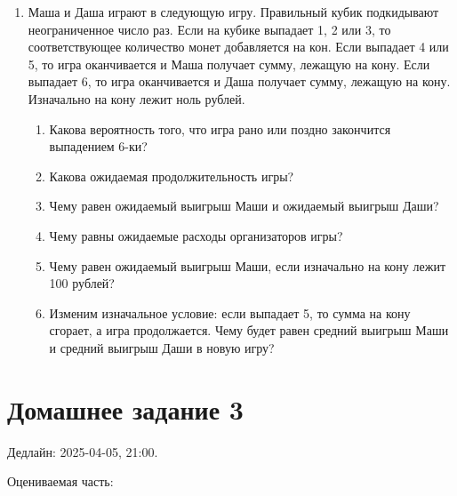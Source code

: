\documentclass[12pt]{article}
\newcommand{\addtag}[1]{}
\begin{document}
\begin{enumerate}[resume]
   \item  Маша и Даша играют в следующую игру. 
 Правильный кубик подкидывают неограниченное число раз.
 Если на кубике\addtag{кубик} выпадает 1, 2 или 3, то соответствующее количество монет добавляется на кон.
 Если выпадает 4 или 5, то игра оканчивается и Маша получает сумму, лежащую на кону.
 Если выпадает 6, то игра оканчивается и Даша получает сумму, лежащую на кону. 
 Изначально на кону лежит ноль рублей.
\begin{enumerate}
\item Какова вероятность того, что игра рано или поздно закончится выпадением 6-ки?
\item Какова ожидаемая продолжительность игры?
\item Чему равен ожидаемый выигрыш Маши и ожидаемый выигрыш Даши?
\item Чему равны ожидаемые расходы организаторов игры?
\item Чему равен ожидаемый выигрыш Маши, если изначально на кону лежит 100 рублей?
\item Изменим изначальное условие: если выпадает 5, то сумма на кону сгорает, а игра продолжается.
Чему будет равен средний выигрыш Маши и средний выигрыш Даши в новую игру?
\end{enumerate}

   
\end{enumerate}


\section*{Домашнее задание 3}

Дедлайн: 2025-04-05, 21:00.

Оцениваемая часть:
\end{document}
